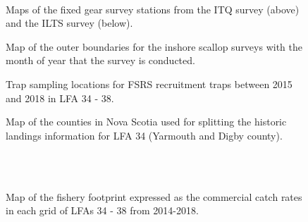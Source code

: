 \documentclass[11pt]{article}
\newcommand{\e}{\string~/bio.data/bio.lobster/figures/LFA3438Framework2019/figures/} %
\begin{document}
     \begin{figure}
    \centering
        \\
        \caption{Maps of the fixed gear survey stations from the ITQ survey (above) and the ILTS survey (below).}
    \end{figure}

\begin{figure}
    \centering
        \caption{Map of the outer boundaries for the inshore scallop surveys with the month of year that the survey is conducted.}
    \end{figure}

   \begin{figure}
    \centering
        \caption{Trap sampling locations for FSRS recruitment traps between 2015 and 2018 in LFA 34 - 38.}

    \end{figure}


\begin{figure}
\centering
    \caption{Map of the counties in Nova Scotia used for splitting the historic landings information for LFA 34 (Yarmouth and Digby county).}

\end{figure}


  \begin{figure}
        \centering
    \\
                \\
        
         \caption{Map of the fishery footprint expressed as the commercial catch rates in each grid of LFAs 34 - 38 from 2014-2018.}
        \end{figure}
\end{document}
